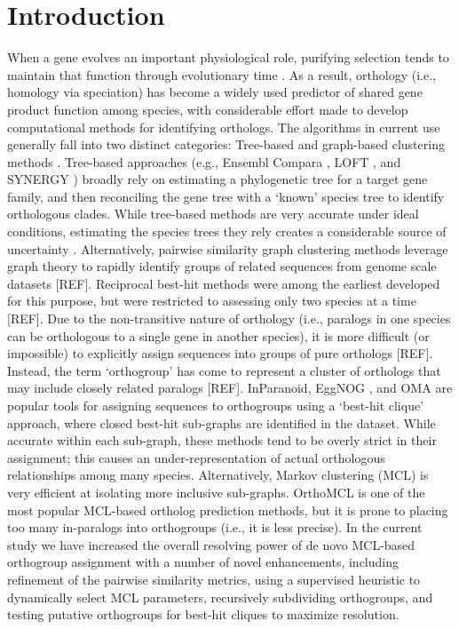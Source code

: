 \documentclass[nogrid]{MBE}%
\begin{document}
\section{{Introduction}\label{sec:Intro}}
When a gene evolves an important physiological role, purifying selection tends to maintain that function through evolutionary time \cite{Altenhoff:2012ea, Rogozin:2014fp, KryuchkovaMostacci:2016iw}. As a result, orthology (i.e., homology via speciation) has become a widely used predictor of shared gene product function among species, with considerable effort made to develop computational methods for identifying orthologs. The algorithms in current use generally fall into two distinct categories: Tree-based and graph-based clustering methods \cite{Tekaia:2016ga}. Tree-based approaches (e.g., Ensembl Compara \cite{Vilella:2009ju}, LOFT \cite{vanderHeijden:2007bo}, and SYNERGY \cite{Wapinski:2007fa}) broadly rely on estimating a phylogenetic tree for a target gene family, and then reconciling the gene tree with a `known' species tree to identify orthologous clades. While tree-based methods are very accurate under ideal conditions, estimating the species trees they rely creates a considerable source of uncertainty \cite{Xu:2016ek}. Alternatively, pairwise similarity graph clustering methods leverage graph theory to rapidly identify groups of related sequences from genome scale datasets [REF]. Reciprocal best-hit methods were among the earliest developed for this purpose, but were restricted to assessing only two species at a time [REF]. Due to the non-transitive nature of orthology (i.e., paralogs in one species can be orthologous to a single gene in another species), it is more difficult (or impossible) to explicitly assign sequences into groups of pure orthologs [REF]. Instead, the term `orthogroup' has come to represent a cluster of orthologs that may include closely related paralogs [REF]. InParanoid, EggNOG \cite{Jensen:2007cc}, and OMA \cite{Roth:2009iu} are popular tools for assigning sequences to orthogroups using a `best-hit clique' approach, where closed best-hit sub-graphs are identified in the dataset. While accurate within each sub-graph, these methods tend to be overly strict in their assignment; this causes an under-representation of actual orthologous relationships among many species. Alternatively, Markov clustering (MCL) is very efficient at isolating more inclusive sub-graphs. OrthoMCL is one of the most popular MCL-based ortholog prediction methods, but it is prone to placing too many in-paralogs into orthogroups (i.e., it is less precise). In the current study we have increased the overall resolving power of de novo MCL-based orthogroup assignment with a number of novel enhancements, including refinement of the pairwise similarity metrics, using a supervised heuristic to dynamically select MCL parameters, recursively subdividing orthogroups, and testing putative orthogroups for best-hit cliques to maximize resolution.
\end{document}
